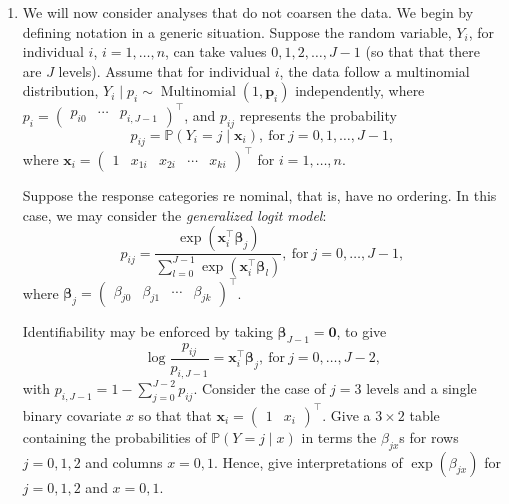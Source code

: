 \documentclass[letterpaper,11pt]{article}
\begin{document}
\begin{enumerate}
\item We will now consider analyses that do not coarsen the data. We begin by
  defining notation in a generic situation. Suppose the random variable, $Y_i$,
  for individual $i$, $i = 1,\ldots,n$, can take values $0,1,2,\ldots,J-1$ (so
  that that there are $J$ levels). Assume that for individual $i$, the data
  follow a multinomial distribution,
  $Y_i \mid p_i \sim \operatorname{Multinomial}\left(1,\mathbf{p}_i\right)$
  independently, where $p_i = \begin{pmatrix}p_{i0} & \cdots & p_{i,J−1}
  \end{pmatrix}^\intercal$, and $p_{ij}$ represents the probability
  \begin{equation}
    p_{ij} = \mathbb{P}\left(Y_i = j \mid \mathbf{x}_i\right),
    ~\text{for}~j=0,1,\ldots,J-1,
    \label{eqn:p4_pij}
  \end{equation}
  where $\mathbf{x}_i = \begin{pmatrix} 1 & x_{1i} & x_{2i} & \cdots & x_{ki}
  \end{pmatrix}^\intercal$ for $i = 1,\ldots,n$.

  Suppose the response categories re nominal, that is, have no ordering. In this
  case, we may consider the \emph{generalized logit model}:
  \begin{equation}
    p_{ij} = \frac{\exp\left(\mathbf{x}_i^\intercal\bm\beta_j\right)}{
      \sum_{l=0}^{J-1}\exp\left(\mathbf{x}_i^\intercal\bm\beta_l\right)
    },~\text{for}~j=0,\ldots,J-1,
  \end{equation}
  where
  $\bm\beta_j = \begin{pmatrix} \beta_{j0} & \beta_{j1} & \cdots & \beta_{jk}
  \end{pmatrix}^\intercal$.

  Identifiability may be enforced by taking $\bm\beta_{J-1} = \mathbf{0}$, to
  give
  \begin{equation}
    \log\frac{p_{ij}}{p_{i,J-1}} = \mathbf{x}_i^\intercal\bm\beta_j,
    ~\text{for}~j=0,\ldots,J-2,
    \label{eqn:p4_log_odds_ratio}
  \end{equation}
  with $p_{i,J-1} = 1 - \sum_{j=0}^{J-2} p_{ij}$. Consider the case of $j = 3$
  levels and a single binary covariate $x$ so that that
  $\mathbf{x}_i = \begin{pmatrix} 1 & x_i \end{pmatrix}^\intercal$. Give a
  $3 \times 2$ table containing the probabilities of
  $\mathbb{P}\left(Y = j \mid x\right)$ in terms the $\beta_{jx}$s for rows
  $j = 0,1,2$ and columns $x=0,1$. Hence, give interpretations of
  $\exp\left(\beta_{jx}\right)$ for $j = 0,1,2$ and $x = 0,1$.


\end{enumerate}
\end{document}
